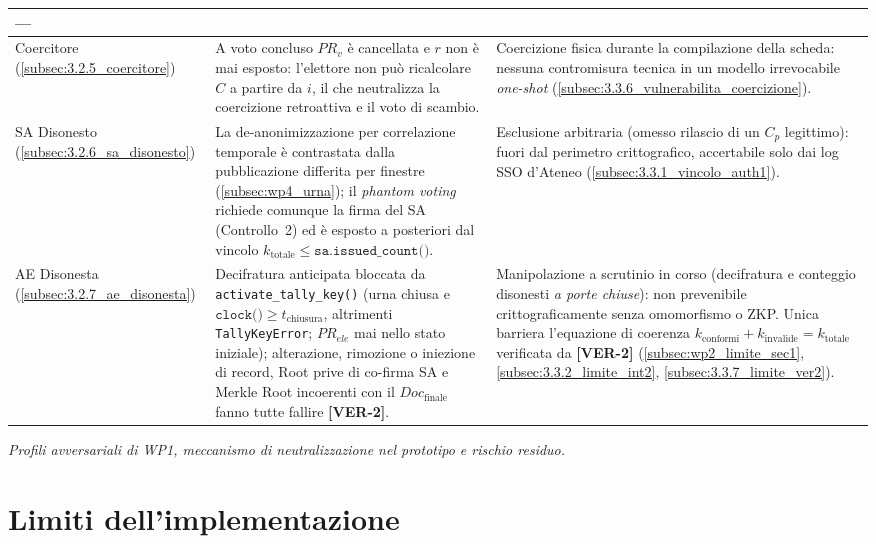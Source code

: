 {\begin{longtable}{|p{1.9cm}|p{5.15cm}|p{5.15cm}|}
  --- \\
\hline
Coercitore \newline (\ref{subsec:3.2.5_coercitore}) &
  A voto concluso $PR_v$ è cancellata e $r$ non è mai esposto: l'elettore non può ricalcolare $C$ a partire da $i$, il che neutralizza la coercizione retroattiva e il voto di scambio. &
  Coercizione fisica durante la compilazione della scheda: nessuna contromisura tecnica in un modello irrevocabile \emph{one-shot} (\ref{subsec:3.3.6_vulnerabilita_coercizione}). \\
\hline
SA Disonesto \newline (\ref{subsec:3.2.6_sa_disonesto}) &
  La de-anonimizzazione per correlazione temporale è contrastata dalla pubblicazione differita per finestre (\ref{subsec:wp4_urna}); il \emph{phantom voting} richiede comunque la firma del SA (Controllo~2) ed è esposto a posteriori dal vincolo $k_{\text{totale}} \le \texttt{sa.issued\_count()}$. &
  Esclusione arbitraria (omesso rilascio di un $C_p$ legittimo): fuori dal perimetro crittografico, accertabile solo dai log SSO d'Ateneo (\ref{subsec:3.3.1_vincolo_auth1}). \\
\hline
AE Disonesta \newline (\ref{subsec:3.2.7_ae_disonesta}) &
  Decifratura anticipata bloccata da \texttt{activate\_tally\_key()} (urna chiusa e $\texttt{clock()} \ge t_{\text{chiusura}}$, altrimenti \texttt{TallyKeyError}; $PR_{ele}$ mai nello stato iniziale); alterazione, rimozione o iniezione di record, Root prive di co-firma SA e Merkle Root incoerenti con il $\mathit{Doc}_{\text{finale}}$ fanno tutte fallire \textbf{[VER-2]}. &
  Manipolazione a scrutinio in corso (decifratura e conteggio disonesti \emph{a porte chiuse}): non prevenibile crittograficamente senza omomorfismo o ZKP. Unica barriera l'equazione di coerenza $k_{\text{conformi}}+k_{\text{invalide}}=k_{\text{totale}}$ verificata da \textbf{[VER-2]} (\ref{subsec:wp2_limite_sec1}, \ref{subsec:3.3.2_limite_int2}, \ref{subsec:3.3.7_limite_ver2}). \\
\hline
\end{longtable}
}
\begin{center}\small\itshape Profili avversariali di WP1, meccanismo di neutralizzazione nel prototipo e rischio residuo.\end{center}


\section{Limiti dell'implementazione}
\label{sec:wp4_limiti}

